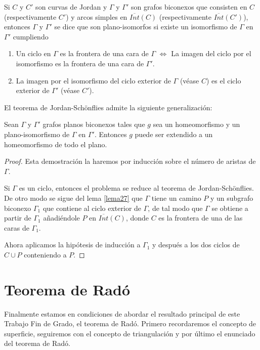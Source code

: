 \documentclass[12pt,a4paper,oldfontcommands]{memoir}
\begin{document}
\begin{definition}
	Si $C$ y $C'$ son curvas de Jordan y $\Gamma$ y $\Gamma'$ son grafos biconexos que consisten en $C$ (respectivamente $C'$) y arcos   simples en $\overline{Int}(C)$ (respectivamente $\overline{Int}(C')$), entonces $\Gamma$ y $\Gamma'$ se dice que son plano-isomorfos si existe un isomorfismo de $\Gamma$ en $\Gamma'$ cumpliendo 
\begin{enumerate}
	\item Un ciclo en $\Gamma$ es la frontera de una cara de $\Gamma$     $\iff$ La imagen del ciclo por el isomorfismo es la frontera de una cara de $\Gamma'$.
	\item La imagen por el isomorfismo del ciclo exterior de $\Gamma$ (véase $C$) es el ciclo exterior de $\Gamma'$ (véase $C'$).
\end{enumerate}	
\end{definition}
El teorema de Jordan-Schönflies admite la siguiente generalización:
\begin{theorem}\label{teorema33}
	Sean $\Gamma$ y $\Gamma'$ grafos planos biconexos tales que $g$ sea un homeomorfismo y un plano-isomorfismo de $\Gamma$ en $\Gamma'$. Entonces $g$ puede ser extendido a un homeomorfismo de todo el plano.
\end{theorem}

\begin{proof}
	Esta demostración la haremos por inducción sobre el número de aristas de $\Gamma$.

	Si $\Gamma$ es un ciclo, entonces el problema se reduce al teorema de Jordan-Schönflies. De otro modo se sigue del lema \ref{lema27} que $\Gamma$ tiene un camino $P$ y un subgrafo biconexo $\Gamma_1$ que contiene al ciclo exterior de $\Gamma$, de tal modo que $\Gamma$ se obtiene a partir de $\Gamma_1$ añadiéndole $P$ en $\overline{Int}(C)$, donde $C$ es la frontera de una de las caras de $\Gamma_1$.

	Ahora aplicamos la hipótesis de inducción a $\Gamma_1$ y después a los dos ciclos de $C \cup P$ conteniendo a $P$.
\end{proof}

\chapter{Teorema de Radó}

Finalmente estamos en condiciones de abordar el resultado principal de este Trabajo Fin de Grado, el teorema de Radó. Primero recordaremos  el concepto de superficie, seguiremos con el concepto de triangulación y por último el enunciado del teorema de Radó.
\end{document}
